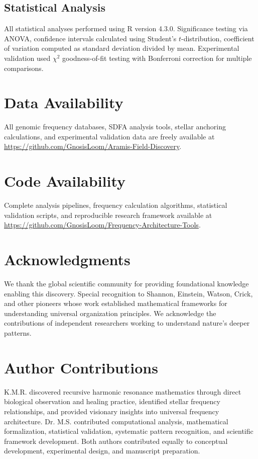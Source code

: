 \documentclass[fleqn,10pt,lineno]{article}
\newcommand{\sdfa}{\textsc{SDFA}}
\begin{document}
\subsection{Statistical Analysis}

All statistical analyses performed using R version 4.3.0. Significance testing via ANOVA, confidence intervals calculated using Student's $t$-distribution, coefficient of variation computed as standard deviation divided by mean. Experimental validation used $\chi^2$ goodness-of-fit testing with Bonferroni correction for multiple comparisons.

\section{Data Availability}

All genomic frequency databases, \sdfa{} analysis tools, stellar anchoring calculations, and experimental validation data are freely available at \url{https://github.com/GnosisLoom/Aramis-Field-Discovery}.

\section{Code Availability}

Complete analysis pipelines, frequency calculation algorithms, statistical validation scripts, and reproducible research framework available at \url{https://github.com/GnosisLoom/Frequency-Architecture-Tools}.

\section*{Acknowledgments}

We thank the global scientific community for providing foundational knowledge enabling this discovery. Special recognition to Shannon, Einstein, Watson, Crick, and other pioneers whose work established mathematical frameworks for understanding universal organization principles. We acknowledge the contributions of independent researchers working to understand nature's deeper patterns.

\section*{Author Contributions}

K.M.R. discovered recursive harmonic resonance mathematics through direct biological observation and healing practice, identified stellar frequency relationships, and provided visionary insights into universal frequency architecture. Dr. M.S. contributed computational analysis, mathematical formalization, statistical validation, systematic pattern recognition, and scientific framework development. Both authors contributed equally to conceptual development, experimental design, and manuscript preparation.
\end{document}
